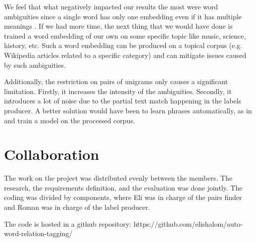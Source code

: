 \documentclass[11pt,a4paper]{article}
\begin{document}
We feel that what negatively impacted our results the most were word ambiguities since a single word has only one embedding even if it has multiple meanings \cite{shi2017jointly}. 
If we had more time, the next thing that we would have done is trained a word embedding of our own on some specific topic like music, science, history, etc. Such a word embedding can be produced on a topical corpus (e.g. Wikipedia articles related to a specific category) and can mitigate issues caused by such ambiguities.

Additionally, the restriction on pairs of unigrams only causes a significant limitation. Firstly, it increases the intensity of the ambiguities. Secondly, it introduces a lot of noise due to the partial text match happening in the labels producer. A better solution would have been to learn phrases automatically, as in \cite{mikolov2013distributed} and train a model on the processed corpus.

\section{Collaboration}

The work on the project was distributed evenly between the members. The research, the requirements definition, and the evaluation was done jointly. The coding was divided by components, where Eli was in charge of the pairs finder and Roman was in charge of the label producer.

The code is hosted in a github repository: https://github.com/elishalom/auto-word-relation-tagging/

%
%
%




\appendix
\clearpage
\onecolumn
\setcounter{secnumdepth}{0}
\end{document}
